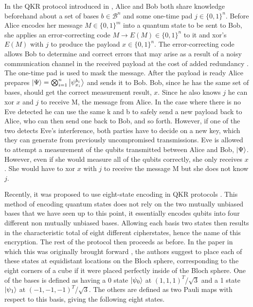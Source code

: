 \documentclass[]{article}
\begin{document}
In the QKR protocol introduced in \cite{cryptoeprint:2019:875}, Alice and Bob both share knowledge beforehand about a set of bases $b \in \mathcal{B}^n$  and some one-time pad $j \in \{0,1\}^n$. Before Alice encodes her message $M \in \{0,1\}^m$ into a quantum state to be sent to Bob, she applies an error-correcting code $M \rightarrow E(M) \in \{0,1\}^n$ to it and xor's $E(M)$ with $j$ to produce the payload $x \in \{0,1\}^n$. The error-correcting code allows Bob to determine and correct errors that may arise as a result of a noisy communication channel in the received payload at the cost of added redundancy \cite{Knill1997}. The one-time pad is used to mask the message. After the payload is ready Alice prepares $\ket{\Psi} = \bigotimes_{i=1}^n \ket{\psi_{x_i}^{b_i}}$ and sends it to Bob. Bob, since he has the same set of bases, should get the correct measurement result, $x$. Since he also knows $j$ he can xor $x$ and $j$ to receive M, the message from Alice. In the case where there is no Eve detected he can use the same k and b to safely send a new payload back to Alice, who can then send one back to Bob, and so forth. However, if one of the two detects Eve's interference, both parties have to decide on a new key, which they can generate from previously uncompromised transmissions. Eve is allowed to attempt a measurement of the qubits transmitted between Alice and Bob, $\ket{\Psi}$. However, even if she would measure all of the qubits correctly, she only receives $x$. She would have to xor $x$ with $j$ to receive the message M but she does not know $j$.

Recently, it was proposed to use eight-state encoding in QKR protocols \cite{DeVries2016}. This method of encoding quantum states does not rely on the two mutually unbiased bases that we have seen up to this point, it essentially encodes qubits into four different non mutually unbiased bases. Allowing each basis two states then results in the characteristic total of eight different cipherstates, hence the name of this encryption. The rest of the protocol then proceeds as before. In the paper in which this was originally brought forward \cite{DeVries2016}, the authors suggest to place each of these states at equidistant locations on the Bloch sphere, corresponding to the eight corners of a cube if it were placed perfectly inside of the Bloch sphere. One of the bases is defined as having a 0 state $\ket{\psi_{0}}$ at $(1,1,1)^T$/$\sqrt{3}$ and a 1 state $\ket{\psi_{1}}$ at $(-1,-1,-1)^T$/$\sqrt{3}$. The others are defined as two Pauli maps with respect to this basis, giving the following eight states.
\end{document}

